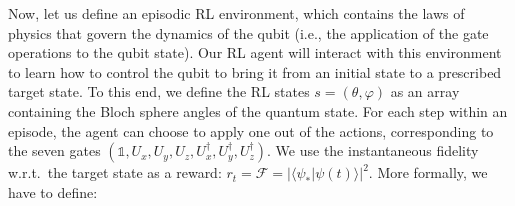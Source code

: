 Now, let us define an episodic RL environment, which contains the laws of physics that govern the dynamics of the qubit (i.e., the application of the gate operations to the qubit state).  Our RL agent will interact with this environment  to learn how to control the qubit to bring it from an initial state to a prescribed target state. To this end, we define the RL states $s=(\theta,\varphi)$ as an array containing the Bloch sphere angles of the quantum state. For each step within an episode, the agent can choose to apply one out of the actions, corresponding to the seven gates $(\mathds{1},U_x,U_y,U_z,U_x^\dagger,U_y^\dagger,U_z^\dagger)$. We use the instantaneous fidelity w.r.t.~the target state as a reward: $r_t=\mathcal F=|\langle\psi_\ast|\psi(t)\rangle|^2$. More formally, we have to define: 
